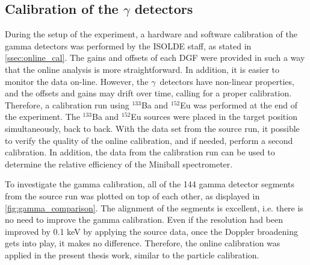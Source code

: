 \documentclass[twoside,english]{uiofysmaster/uiofysmaster}
\newcommand{\Sm}{$^{140}$Sm} %
\newcommand{\Pb}{$^{208}$Pb}
\newcommand{\ga}{$\gamma$}
\let\orgautoref\autoref
\renewcommand{\autoref}
        {%
		 \def\sectionautorefname{Section}%
		 \def\subsectionautorefname{Section}%
		 \def\subsubsectionautorefname{Section}%
		 \def\chapterautorefname{Chapter}%
          \orgautoref}
\begin{document}

\subsection{Calibration of the \texorpdfstring{$\gamma$}{gamma} detectors}\label{ssec:gamma}



During the setup of the experiment, a hardware and software calibration of the gamma detectors was performed by the ISOLDE staff, as stated in \autoref{ssec:online_cal}. 
The gains and offsets of each DGF were provided in such a way that the online analysis is more straightforward. 
In addition, it is easier to monitor the data on-line. 
However, the \ga\ detectors have non-linear properties, and the offsets and gains may drift over time, calling for a proper calibration. 
Therefore, a calibration run using $^{133}$Ba and $^{152}$Eu was performed at the end of the experiment. 
The $^{133}$Ba and $^{152}$Eu sources were placed in the target position simultaneously, back to back. 
With the data set from the source run, it possible to verify the quality of the online calibration, and if needed, perform a second calibration. 
In addition, the data from the calibration run can be used to determine the relative efficiency of the Miniball spectrometer.

To investigate the gamma calibration, all of the 144 gamma detector segments from the source run was plotted on top of each other, as displayed in \autoref{fig:gamma_comparison}. 
The alignment of the segments is excellent, i.e. there is no need to improve the gamma calibration. 
Even if the resolution had been improved by 0.1 keV by applying the source data, once the Doppler broadening gets into play, it makes no difference. 
Therefore, the online calibration was applied in the present thesis work, similar to the particle calibration.
\end{document}
